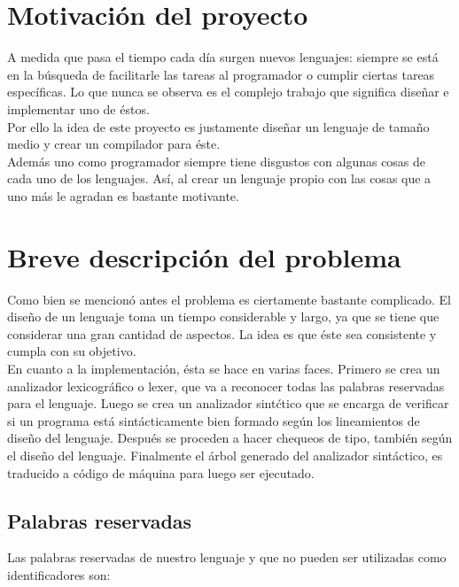 \documentclass[11pt, spanish]{report}
\begin{document}
\section{Motivaci\'on del proyecto}

A medida que pasa el tiempo cada d\'ia surgen nuevos lenguajes: siempre se est\'a en la b\'usqueda de facilitarle las tareas al programador o 
cumplir ciertas tareas espec\'ificas. Lo que nunca se observa es el complejo trabajo que significa dise\~nar e implementar uno de \'estos.\\

Por ello la idea de este proyecto es justamente dise\~nar un lenguaje de tama\~no medio y crear un compilador para \'este.\\

Adem\'as uno como programador siempre tiene disgustos con algunas cosas de cada uno de los lenguajes.  As\'i, al crear un lenguaje propio 
con las cosas que a uno m\'as le agradan es bastante motivante.\\

\section{Breve descripci\'on del problema}

Como bien se mencion\'o antes el problema es ciertamente bastante complicado. El dise\~no de un lenguaje toma un tiempo considerable y largo, 
ya que se tiene que considerar una gran cantidad de aspectos. La idea es que \'este sea consistente y cumpla con su objetivo.\\

En cuanto a la implementaci\'on, \'esta se hace en varias faces. Primero se crea un analizador lexicogr\'afico o lexer, que va a reconocer 
todas las palabras reservadas para el lenguaje. Luego se crea un analizador sint\'ctico que se encarga de  verificar si un programa est\'a 
sint\'acticamente bien formado seg\'un los lineamientos de dise\~no del lenguaje. Despu\'es se proceden a hacer chequeos de tipo, tambi\'en 
seg\'un el dise\~no del lenguaje. Finalmente el \'arbol generado del analizador sint\'actico, es traducido a c\'odigo de m\'aquina para luego 
ser ejecutado.\\

\subsection{Palabras reservadas}

Las palabras reservadas de nuestro lenguaje y que no pueden ser utilizadas como identificadores son: 
\end{document}
